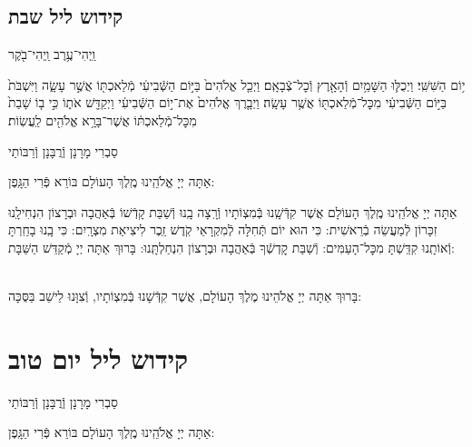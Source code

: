 \documentclass[twoside, openany, parskip=half, 11pt]{book}
\begin{document}
\section*{ קידוש ליל שבת }

\begin{small}וַֽיְהִי־עֶ֥רֶב וַֽיְהִי־בֹ֖קֶר\end{small}
 י֥וֹם הַשִּׁשִּֽׁי׃ וַיְכֻלּ֛וּ הַשָּׁמַ֥יִם וְֿהָאָ֖רֶץ וְֿכׇל־צְֿבָאָֽם׃ וַיְכַ֤ל אֱלֹהִים֙ בַּיּ֣וֹם הַשְּֿׁבִיעִ֔י מְֿלַאכְתּ֖וֹ אֲשֶׁ֣ר עָשָׂ֑ה וַיִּשְׁבֹּת֙ בַּיּ֣וֹם הַשְּֿׁבִיעִ֔י מִכׇּל־מְֿלַאכְתּ֖וֹ אֲשֶׁ֥ר עָשָֽׂה׃ וַיְבָ֤רֶךְ אֱלֹהִים֙ אֶת־י֣וֹם הַשְּֿׁבִיעִ֔י וַיְקַדֵּ֖שׁ אֹת֑וֹ כִּ֣י ב֤וֹ שָׁבַת֙ מִכׇּל־מְֿלַאכְתּ֔וֹ אֲשֶׁר־בָּרָ֥א אֱלֹהִ֖ים לַֽעֲשֽׂוֹת׃

\begin{footnotesize}
סַבְרִי מָרָנָן וְֿרֲבָּנָן וְֿרַבּוֹתַי\\
\end{footnotesize}
 אַתָּה יְיָ אֱלֹהֵֽינוּ מֶֽלֶךְ הָעוֹלָם בּוֹרֵא פְּֿרִי הַגָּֽפֶן:

 אַתָּה יְיָ אֱלֹהֵֽינוּ מֶֽלֶךְ הָעוֹלָם אֲשֶׁר קִדְּֿשָֽׁנוּ בְּֿמִצְוֹתָיו וְֿרָֽצָה בָֽנוּ וְֿשַׁבַּת קָדְֿשׁוֹ בְּֿאַהֲבָה וּבְרָצוֹן הִנְחִילָֽנוּ זִכָּרוֹן לְֿמַעֲשֵׂה בְֿרֵאשִׁית: כִּי הוּא יוֹם תְּֿחִלָּה לְֿמִקְרָאֵי קֹֽדֶשׁ זֵֽכֶר לִיצִיאַת מִצְרָֽיִם: כִּי בָֽנוּ בָחַֽרְתָּ וְֿאוֹתָֽנוּ קִדַּֽשְׁתָּ מִכׇּל־הָעַמִּים: וְֿשַׁבַּת קׇדְשְֿׁךָ בְּֿאַהֲבָה וּבְרָצוֹן הִנְחַלְתָּֽנוּ: בָּרוּךְ אַתָּה יְיָ מְֿקַדֵּשׁ הַשַּׁבָּת:

\begin{sometimes}

\\
בָּרוּךְ אַתָּה יְיָ אֱלֹהֵינוּ מֶלֶךְ הָעוֹלָם, אֲשֶׁר קִדְּֿשָׁנוּ בְּֿמִצְוֹתָיו, וְֿצִוָּנוּ לֵישֵׁב בַּסֻּכָּה:

\end{sometimes}

\chapter[קידוש ליל יום טוב]{ קידוש ליל יום טוב }
\label{kiddush leil yom tov}

\begin{footnotesize}
סַבְרִי מָרָנָן וְֿרֲבָּנָן וְֿרַבּוֹתַי\\
\end{footnotesize}
 אַתָּה יְיָ אֱלֹהֵֽינוּ מֶֽלֶךְ הָעוֹלָם בּוֹרֵא פְּֿרִי הַגָּֽפֶן:
\end{document}
